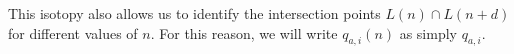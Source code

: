 \documentclass[12pt]{amsart}
\begin{document}
This isotopy also allows us to identify the intersection points $L(n)\cap L(n+d)$ for different values of $n$. For this reason, we will write $q_{a,i}(n)$ as simply $q_{a,i}$.




\end{document}
